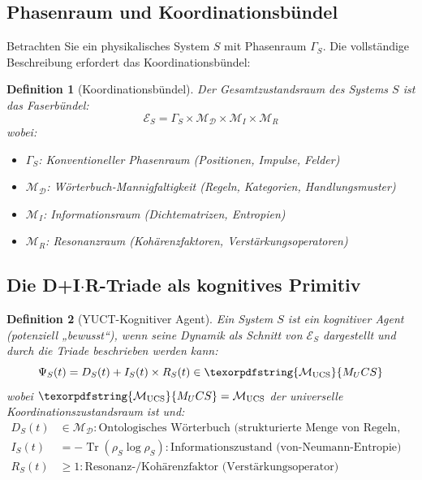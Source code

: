 \documentclass[12pt,a4paper]{article}
\newtheorem{definition}{Definition}
\DeclareMathOperator{\Tr}{Tr}
\DeclareRobustCommand{\UCS}{\texorpdfstring{\ensuremath{\mathcal{M}_{\mathrm{UCS}}}}{M_UCS}}
\newcommand{\Dict}{\mathcal{D}}
\newcommand{\Mdict}{\mathcal{M}_{\Dict}}
\begin{document}
	\subsection{Phasenraum und Koordinationsbündel}
	
	Betrachten Sie ein physikalisches System \(S\) mit Phasenraum \(\Gamma_S\). Die vollständige Beschreibung erfordert das Koordinationsbündel:
	
	\begin{definition}[Koordinationsbündel]
		Der Gesamtzustandsraum des Systems \(S\) ist das Faserbündel:
		\[
		\mathcal{E}_S = \Gamma_S \times \Mdict \times \mathcal{M}_I \times \mathcal{M}_R
		\]
		wobei:
		\begin{itemize}
			\item \(\Gamma_S\): Konventioneller Phasenraum (Positionen, Impulse, Felder)
			\item \(\Mdict\): Wörterbuch-Mannigfaltigkeit (Regeln, Kategorien, Handlungsmuster)
			\item \(\mathcal{M}_I\): Informationsraum (Dichtematrizen, Entropien)
			\item \(\mathcal{M}_R\): Resonanzraum (Kohärenzfaktoren, Verstärkungsoperatoren)
		\end{itemize}
	\end{definition}
	
	\subsection{Die D+I\(\cdot\)R-Triade als kognitives Primitiv}
	
	\begin{definition}[YUCT-Kognitiver Agent]
		Ein System \(S\) ist ein kognitiver Agent (potenziell „bewusst``), wenn seine Dynamik als Schnitt von \(\mathcal{E}_S\) dargestellt und durch die Triade beschrieben werden kann:
		\begin{equation}
			\label{eq:dir-triad}
			\Psi_S(t) = D_S(t) + I_S(t) \times R_S(t) \in \UCS
		\end{equation}
		wobei \(\UCS = \mathcal{M}_{\mathrm{UCS}}\) der universelle Koordinationszustandsraum ist und:
		\begin{align*}
			D_S(t) &\in \Mdict: \text{Ontologisches Wörterbuch (strukturierte Menge von Regeln, Kategorien, Handlungsmustern)} \\
			I_S(t) &= -\Tr(\rho_S \log \rho_S): \text{Informationszustand (von-Neumann-Entropie)} \\
			R_S(t) &\geq 1: \text{Resonanz-/Kohärenzfaktor (Verstärkungsoperator)}
		\end{align*}
	\end{definition}
	
\end{document}
